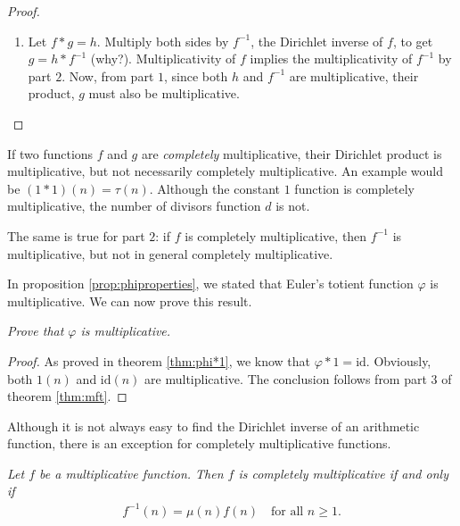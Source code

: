 \documentclass[12pt]{subfile}
\begin{document}
\begin{proof}
\begin{enumerate}
				\item Let $f\ast g=h$. Multiply both sides by $f^{-1}$, the Dirichlet inverse of $f$, to get $g = h \ast f^{-1}$ (why?). Multiplicativity of $f$ implies the multiplicativity of $f^{-1}$ by part $2$. Now, from part $1$, since both $h$ and $f^{-1}$ are multiplicative, their product, $g$ must also be multiplicative.
			\end{enumerate}
		\end{proof}

		\begin{note}
			If two functions $f$ and $g$ are \textit{completely} multiplicative, their Dirichlet product is multiplicative, but not necessarily completely multiplicative. An example would be $(1 \ast 1)(n) = \tau(n)$. Although the constant $1$ function is completely multiplicative, the number of divisors function $d$ is not.

			The same is true for part $2$: if $f$ is completely multiplicative, then $f^{-1}$ is multiplicative, but not in general completely multiplicative.
		\end{note}

	In proposition \ref{prop:phiproperties}, we stated that Euler's totient function $\varphi$ is multiplicative. We can now prove this result.

		\begin{proposition}\slshape\label{prop:multiplicativephi}
			Prove that $\varphi$ is multiplicative.
		\end{proposition}

		\begin{proof}
			As proved in theorem \ref{thm:phi*1}, we know that $\varphi \ast 1 = \text{id}$. Obviously, both $1(n)$ and $\text{id}(n)$ are multiplicative. The conclusion follows from part $3$ of theorem \ref{thm:mft}.
		\end{proof}


Although it is not always easy to find the Dirichlet inverse of an arithmetic function, there is an exception for completely multiplicative functions.

		\begin{theorem}\slshape\label{thm:completelymultiplicative}
			Let $f$ be a multiplicative function. Then $f$ is completely multiplicative if and only if
				\begin{align*}
					f^{-1}(n) = \mu(n) f(n) \quad \text{for all } n \geq 1.
				\end{align*}
		\end{theorem}
\end{document}

